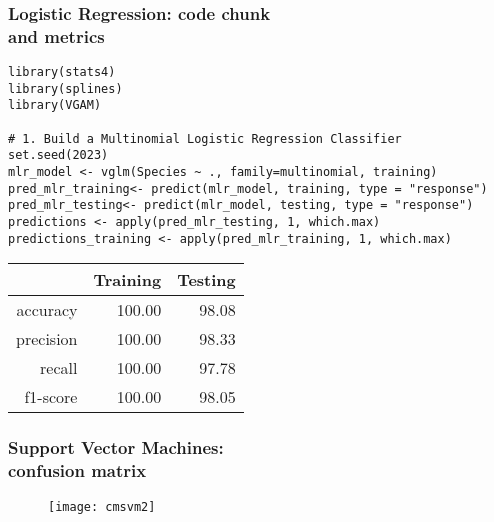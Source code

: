 \documentclass[border=5mm, convert, usenames, dvipsnames,beamer]{standalone}
\begin{document}
\begin{frame}[ fragile]{}
\frametitle{Logistic Regression: code chunk \\ and metrics}

\vspace{30}
\noindent


\begin{lstlisting}[style=R]
library(stats4) 
library(splines) 
library(VGAM) 

# 1. Build a Multinomial Logistic Regression Classifier
set.seed(2023)
mlr_model <- vglm(Species ~ ., family=multinomial, training)
pred_mlr_training<- predict(mlr_model, training, type = "response")
pred_mlr_testing<- predict(mlr_model, testing, type = "response")
predictions <- apply(pred_mlr_testing, 1, which.max)
predictions_training <- apply(pred_mlr_training, 1, which.max)
\end{lstlisting}


\begin{table}[ht]
\centering
\begin{tabular}{rrr}
  \hline
 & Training & Testing \\ 
  \hline
accuracy & 100.00 & 98.08 \\ 
  precision & 100.00 & 98.33 \\ 
  recall & 100.00 & 97.78 \\ 
  f1-score & 100.00 & 98.05 \\ 
   \hline
\end{tabular}
\end{table}

\end{frame}






















\begin{frame}[ fragile]{}
\frametitle{Support Vector Machines: \\ confusion matrix}

\vspace{40}
\noindent

\vspace{0mm}
\begin{figure}[h!]
\begin{center}
\texttt{[image: cmsvm2]}
\end{center}
\end{figure}




\end{frame}
\end{document}
